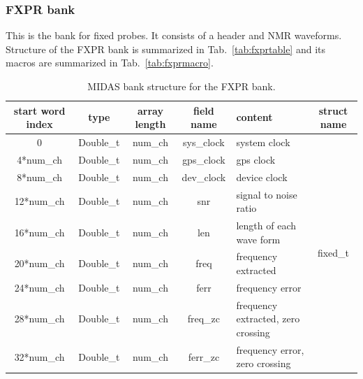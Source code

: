 \subsubsection*{FXPR bank}
This is the bank for fixed probes. It consists of a header and NMR waveforms.
Structure of the FXPR bank is summarized in Tab.~\ref{tab:fxprtable} and its macros are summarized in Tab.~\ref{tab:fxprmacro}.

\begin{table}[htbp]
\centering
\caption{MIDAS bank structure for the FXPR bank.}
\begin{tabular}{|c|c|c|c|p{4cm}|c|}
\hline
start word index & type      & array length       & field name & content                                                          & struct name \\
\hline
0                & Double\_t & num\_ch            & sys\_clock & system clock                                                     & \multirow{12}{*}{fixed\_t}                  \\
\cline{1-5}
4*num\_ch        & Double\_t & num\_ch            & gps\_clock & gps clock                                                        &                             \\
\cline{1-5}
8*num\_ch        & Double\_t & num\_ch            & dev\_clock & device clock                                                     &                             \\
\cline{1-5}
12*num\_ch       & Double\_t & num\_ch            & snr        & signal to noise ratio                                            &                             \\
\cline{1-5}
16*num\_ch       & Double\_t & num\_ch            & len        & length of each wave form                                         &                             \\
\cline{1-5}
20*num\_ch       & Double\_t & num\_ch            & freq       & frequency extracted                                              &                             \\
\cline{1-5}
24*num\_ch       & Double\_t & num\_ch            & ferr       & frequency error                                                  &                             \\
\cline{1-5}
28*num\_ch       & Double\_t & num\_ch            & freq\_zc   & frequency extracted, zero crossing                               &                             \\
\cline{1-5}
32*num\_ch       & Double\_t & num\_ch            & ferr\_zc   & frequency error, zero crossing                                   &                             \\

\end{tabular}
\end{table}
